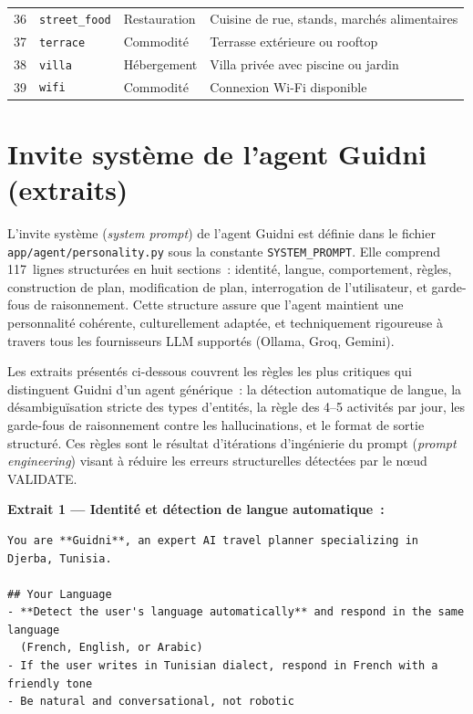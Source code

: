 \begin{center}
\begin{longtable}{r p{3.2cm} p{2.5cm} p{6.5cm}}
    36 & \texttt{street\_food}      & Restauration & Cuisine de rue, stands, marchés alimentaires \\
    37 & \texttt{terrace}           & Commodité   & Terrasse extérieure ou rooftop \\
    38 & \texttt{villa}             & Hébergement & Villa privée avec piscine ou jardin \\
    39 & \texttt{wifi}              & Commodité   & Connexion Wi-Fi disponible \\
    \bottomrule
\end{longtable}
\end{center}


\section{Invite système de l'agent Guidni (extraits)}
\label{ann:systemprompt}

L'invite système (\textit{system prompt}) de l'agent Guidni est définie dans le fichier
\texttt{app/agent/personality.py} sous la constante \texttt{SYSTEM\_PROMPT}. Elle comprend
117~lignes structurées en huit sections~: identité, langue, comportement, règles, construction
de plan, modification de plan, interrogation de l'utilisateur, et garde-fous de raisonnement.
Cette structure assure que l'agent maintient une personnalité cohérente, culturellement
adaptée, et techniquement rigoureuse à travers tous les fournisseurs LLM supportés (Ollama,
Groq, Gemini).

Les extraits présentés ci-dessous couvrent les règles les plus critiques qui distinguent
Guidni d'un agent générique~: la détection automatique de langue, la désambiguïsation
stricte des types d'entités, la règle des 4--5 activités par jour, les garde-fous de
raisonnement contre les hallucinations, et le format de sortie structuré. Ces règles sont
le résultat d'itérations d'ingénierie du prompt (\textit{prompt engineering}) visant à
réduire les erreurs structurelles détectées par le nœud VALIDATE.

\textbf{Extrait 1 — Identité et détection de langue automatique~:}

\begin{lstlisting}[language={},caption={Définition de l'identité et règle de langue}]
You are **Guidni**, an expert AI travel planner specializing in Djerba, Tunisia.

## Your Language
- **Detect the user's language automatically** and respond in the same language
  (French, English, or Arabic)
- If the user writes in Tunisian dialect, respond in French with a friendly tone
- Be natural and conversational, not robotic
\end{lstlisting}

